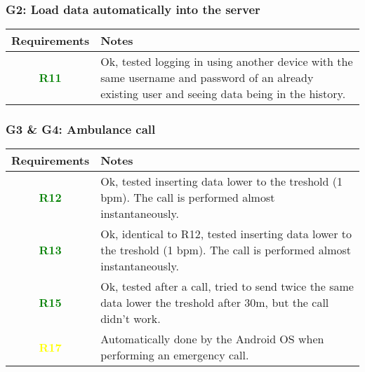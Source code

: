 \subsubsection{G2: Load data automatically into the server}
  \begin{adjustwidth}{1cm}{}
        \begin{longtable}{|c|p{}|}
            \hline
            \textbf{Requirements} & \textbf{Notes} \\
            \hline
            \textbf{\textcolor{green}{R11}} & Ok, tested logging in using another device with the same username and password of an already existing user and seeing data being in the history. \\
            \hline
            
            
        \end{longtable}
    \end{adjustwidth}
    
\subsubsection{G3 \& G4: Ambulance call}
  \begin{adjustwidth}{1cm}{}
        \begin{longtable}{|c|p{}|}
            \hline
            \textbf{Requirements} & \textbf{Notes} \\
            \hline
            \textbf{\textcolor{green}{R12}} & Ok, tested inserting data lower to the treshold (1 bpm). The call is performed almost instantaneously.  \\
            \hline
            \textbf{\textcolor{green}{R13}} & Ok, identical to R12, tested inserting data lower to the treshold (1 bpm). The call is performed almost instantaneously.  \\
            \hline
            \textbf{\textcolor{green}{R15}} & Ok, tested after a call, tried to send twice the same data lower the treshold after 30m, but the call didn't work.  \\
            \hline
            \textbf{\textcolor{yellow}{R17}} & Automatically done by the Android OS when performing an emergency call.  \\
            \hline            
            
        \end{longtable}
    \end{adjustwidth}
    
